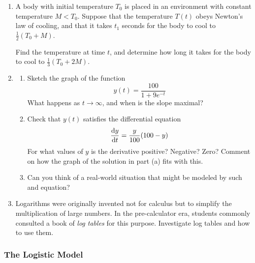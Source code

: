 \begin{exercises}{}{}
\begin{enumerate}
		
 		\item A body with initial temperature $T_0$ is placed in an environment with constant temperature $M<T_0$. Suppose that the temperature $T(t)$ obeys Newton's law of cooling, and that it takes $t_1$ seconds for the body to cool to $\frac 12(T_0+M)$.\par
 		Find the temperature at time $t$, and determine how long it takes for the body to cool to $\frac 13(T_0+2M)$.
 		
 		
 		\item\begin{enumerate}
 		  \item Sketch the graph of the function
 		  \[
 		  	y(t)=\frac{100}{1+9e^{-t}}
 		  \]
 		  What happens as $t\to\infty$, and when is the slope maximal?
 		  \item Check that $y(t)$ satisfies the differential equation
 		  \[
 		  	\diff[y]{t}=\frac y{100}(100-y)
 		  \]
 		  For what values of $y$ is the derivative positive? Negative? Zero? Comment on how the graph of the solution in part (a) fits with this.
 		  \item Can you think of a real-world situation that might be modeled by such and equation? 
 		\end{enumerate}


	  \item Logarithms were originally invented not for calculus but to simplify the multiplication of large numbers. In the pre-calculator era, students commonly consulted a book of \emph{log tables} for this purpose. Investigate log tables and how to use them.
	\end{enumerate}
\end{exercises}


\clearpage



\iffalse



\subsubsection*{The Logistic Model}

